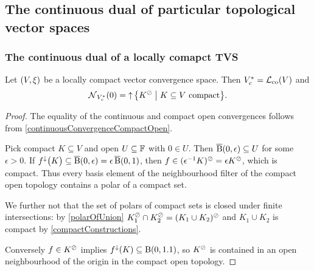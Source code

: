 \subsection{The continuous dual of particular topological vector spaces}
\subsubsection{The continuous dual of a locally comapct TVS}
\begin{proposition} \label{continuousDualLocallyCompactTVS}
Let $\sSet{V,\xi}$ be a locally compact vector convergence space. Then ${V}^*_c = \operatorname{\mathcal{L}}_\text{co}(V)$ and
\[ \neighbourhood_{\dual{V}_c}(0) = \upset\setbuilder{K^\pol}{\text{$K\subseteq V$ compact}}. \]
\end{proposition}
\begin{proof}
The equality of the continuous and compact open convergences follows from \ref{continuousConvergenceCompactOpen}.

Pick compact $K\subseteq V$ and open $U\subseteq \mathbb{F}$ with $0\in U$. Then $\operatorname{\overline{B}}(0,\epsilon)\subseteq U$ for some $\epsilon >0$. If $f^\downarrow\big(K\big) \subseteq \operatorname{\overline{B}}(0,\epsilon) = \epsilon \operatorname{\overline{B}}(0,1)$, then $f\in (\epsilon^{-1}K)^\oslash = \epsilon K^\oslash$, which is compact. Thus every basis element of the neighbourhood filter of the compact open topology contains a polar of a compact set.

We further not that the set of polars of compact sets is closed under finite intersections: by \ref{polarOfUnion} $K_1^\oslash \cap K_2^\oslash = (K_1\cup K_2)^\oslash$ and $K_1\cup K_2$ is compact by \ref{compactConstructions}.

Conversely $f\in K^\oslash$ implies $f^{\downarrow}(K) \subseteq \operatorname{B}(0, 1.1)$, so $K^\oslash$ is contained in an open neighbourhood of the origin in the compact open topology.
\end{proof}


